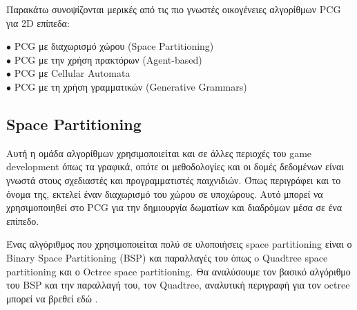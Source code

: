 Παρακάτω συνοψίζονται μερικές από τις πιο γνωστές οικογένειες αλγορίθμων PCG για 2D επίπεδα:

\begin{description}
  \item[$\bullet$ PCG με διαχωρισμό χώρου (Space Partitioning)] 
  \item[$\bullet$ PCG με την χρήση πρακτόρων (Agent-based)]
    \item[$\bullet$ PCG με Cellular Automata] 
    \item[$\bullet$ PCG με τη χρήση γραμματικών (Generative Grammars)] 
\end{description}

\subsection{Space Partitioning}
Αυτή η ομάδα αλγορίθμων χρησιμοποιείται και σε άλλες περιοχές του game development όπως τα γραφικά, οπότε οι μεθοδολογίες και οι δομές δεδομένων είναι γνωστά στους σχεδιαστές και προγραμματιστές παιχνιδιών. Όπως περιγράφει και το όνομα της, εκτελεί έναν διαχωρισμό του χώρου σε υποχώρους. Αυτό μπορεί να χρησιμοποιηθεί στο PCG για την δημιουργία δωματίων και διαδρόμων μέσα σε ένα  επίπεδο. \cite{pcgspacepart}
\par
Ένας αλγόριθμος που χρησιμοποιείται πολύ σε υλοποιήσεις space partitioning είναι ο Binary Space Partitioning (BSP) \cite{bsp} και παραλλαγές του όπως o Quadtree space partitioning και ο Octree space partitioning. Θα αναλύσουμε τον βασικό αλγόριθμο του BSP και την παραλλαγή του, τον Quadtree, αναλυτική περιγραφή για τον octree μπορεί να βρεθεί εδώ \cite{octree}.

